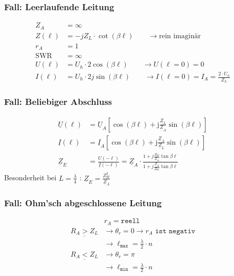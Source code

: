 \subsubsection{Fall: Leerlaufende Leitung}
\begin{align*}
    Z_A          & = \infty                                                                         \\
    Z(\ell)         & = -jZ_L\cdot \cot(\beta \ell) \qquad\rightarrow\text{rein imaginär}                 \\
    r_A          & = 1                                                                              \\
    \mathrm{SWR} & = \infty                                                                         \\
    U(\ell)         & = U_h\cdot 2\cos(\beta \ell) \qquad\rightarrow U(\ell=0)=0                             \\
    I(\ell)         & = U_h\cdot 2j\sin(\beta \ell) \qquad\rightarrow I(\ell=0)=I_A = \frac{2\cdot U_h}{Z_L}
\end{align*}

\subsubsection{Fall: Beliebiger Abschluss}
\begin{align*}
    \underline{U}(\ell) &= \underline{U}_A\left[\cos (\beta \ell)+\mathrm{j} \frac{\underline{Z}_L}{\underline{Z}_A} \sin (\beta \ell)\right] \\
    \underline{I}(\ell) &= \underline{I}_A\left[\cos (\beta \ell)+\mathrm{j} \frac{\underline{Z}_A}{\underline{Z}_L} \sin (\beta \ell)\right] \\
    \underline{Z}_E     &= \frac{U(-\ell)}{\underline{I}(-\ell)}= \underline{Z}_A \cdot \frac{1+j \frac{Z_W}{\underline{Z}_A} \tan \beta \ell}{1+j \frac{\underline{Z}_A}{Z_W} \tan \beta \ell} 
\end{align*}
Besonderheit bei $L=\frac{\lambda}{4}$ :
$ \underline{Z}_E=\frac{Z_{W}^2}{\underline{Z}_A}$

\subsubsection{Fall: Ohm'sch abgeschlossene Leitung}
\begin{align*}
                          & r_A = \texttt{reell} \\
    \underline{R_A > Z_L} & \rightarrow\theta_r = 0 \rightarrow r_A \texttt{ ist negativ} \\
                          & \rightarrow \ell_\texttt{max}=\frac{\lambda}{2}\cdot n \\
    \underline{R_A < Z_L} & \rightarrow\theta_r = \pi                           \\
                          & \rightarrow \ell_\texttt{min}=\frac{\lambda}{2}\cdot n
\end{align*}

